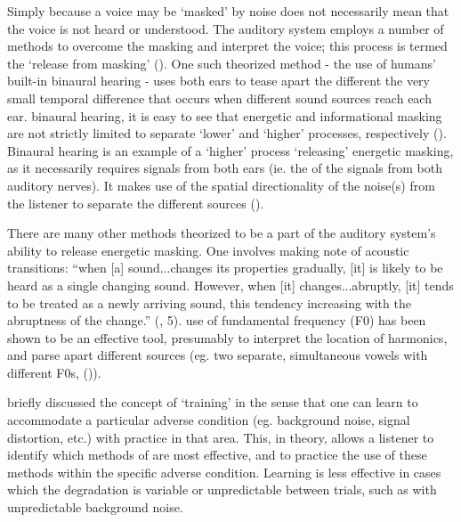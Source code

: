 Simply because a voice may be `masked' by noise does not necessarily mean that the voice is not heard or understood.  The auditory system employs a number of methods to overcome the masking and interpret the voice; this process is termed the `release from masking' (\cite{middlebrooks:17}).  One such theorized method - the use of humans' built-in binaural hearing - uses both ears to tease apart the different \DIFdelbegin {}\DIFdelend \DIFaddbegin {}\DIFaddend the very small temporal difference that occurs when different sound sources reach each ear.  
\DIFdelbegin {}\DIFdelend \DIFaddbegin {}\DIFaddend binaural hearing, it is easy to see that energetic and informational masking are not strictly limited to separate `lower' and `higher' processes, respectively (\cite{durlach:06}).
Binaural hearing is an example of a `higher' process `releasing' energetic masking, as it necessarily requires signals from both ears (ie. the \DIFdelbegin {}\DIFdelend \DIFaddbegin {}\DIFaddend of the signals from both auditory nerves\DIFdelbegin {}\DIFdelend \DIFaddbegin \DIFadd{; }\DIFaddend \cite{hirsh:48}). It makes use of the spatial directionality of the noise(s) from the listener to separate the different sources (\cite{bregman:94}).

There are many other methods theorized to be a part of the auditory system's ability to release energetic masking.  One involves making note of acoustic transitions: ``when [a] sound...changes its properties gradually, [it] is likely to be heard as a single changing sound.  However, when [it] changes...abruptly, [it] tends to be treated as a newly arriving sound, this tendency increasing with the abruptness of the change.'' (\cite{bregman:94}, 5).  \DIFdelbegin {}\DIFdelend \DIFaddbegin {}\DIFaddend use of fundamental frequency (F0) has \DIFdelbegin {}\DIFdelend been shown to be an effective tool, presumably to interpret the location of harmonics, and parse apart different sources (eg. two separate, simultaneous vowels with different F0s, (\cite{bird:97})). %

\cite{mattys:12} \DIFaddbegin {}\DIFaddend briefly discussed the concept of `training' in the sense that one can learn to accommodate a particular adverse condition (eg. background noise, signal distortion, etc.) with practice in that area.  This, in theory, allows a listener to identify which methods of \DIFdelbegin {}\DIFdelend \DIFaddbegin {}\DIFaddend are most effective, and to practice the use of these methods within the specific adverse condition.  Learning is less effective in cases which the degradation is variable or unpredictable between trials, such as with \DIFaddbegin {}\DIFaddend unpredictable background noise.


